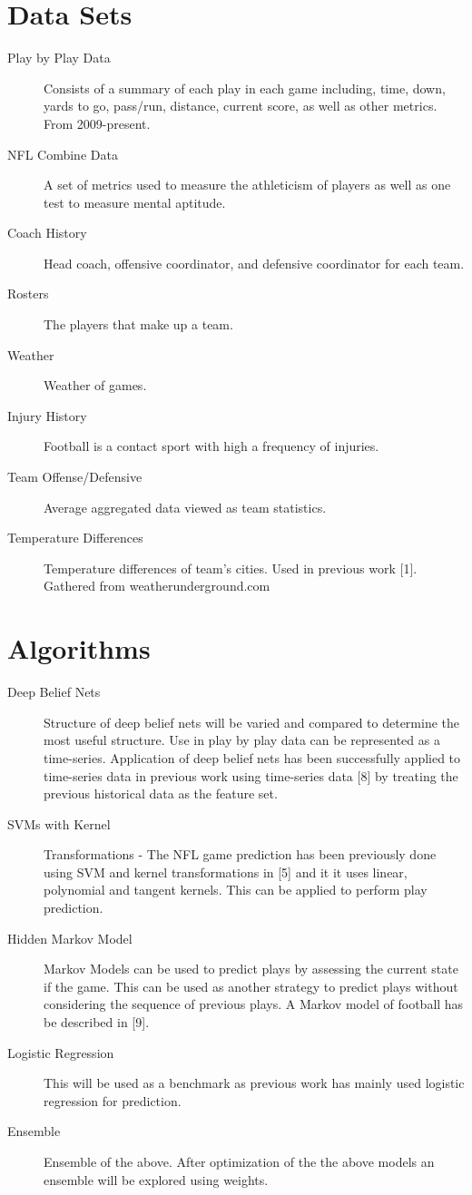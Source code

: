 \documentclass[english]{article}
\begin{document}
\section*{Data Sets}
\begin{description}
\item[{Play by Play Data}] Consists of a summary of each play in each game including, time, down, yards to go, pass/run, distance, current score, as well as other metrics. From 2009-present.
\item[{NFL Combine Data}] A set of metrics used to measure the athleticism of players as well as one test to measure mental aptitude.
\item[{Coach History}] Head coach, offensive coordinator, and defensive coordinator for each team.
\item[{Rosters}] The players that make up a team.
\item[{Weather}] Weather of games.
\item[{Injury History}] Football is a contact sport with high a frequency of injuries. 
\item[{Team Offense/Defensive}] Average aggregated data viewed as team statistics.
\item[{Temperature Differences}] Temperature differences of team's cities. Used in previous work [1]. Gathered from weatherunderground.com
\end{description}

\section*{Algorithms}
\begin{description}
\item[{Deep Belief Nets}] Structure of deep belief nets will be varied and compared to determine the most useful structure. Use in play by play data can be represented as a time-series. Application of deep belief nets has been successfully applied to time-series data in previous work using time-series data [8] by treating the previous historical data as the feature set. 
\item[{SVMs with Kernel}] Transformations - The NFL game prediction has been previously done using SVM and kernel transformations in [5] and it it uses linear, polynomial and tangent kernels. This can be applied to perform play prediction.
\item[{Hidden Markov Model}] Markov Models can be used to predict plays by assessing the current state if the game. This can be used as another strategy to predict plays without considering the sequence of previous plays. A Markov model of football has be described in [9].
\item[{Logistic Regression}] This will be used as a benchmark as previous work has mainly used logistic regression for prediction.
\item[{Ensemble}] Ensemble of the above. After optimization of the the above models an ensemble will be explored using weights. 

\end{description}
\end{document}
